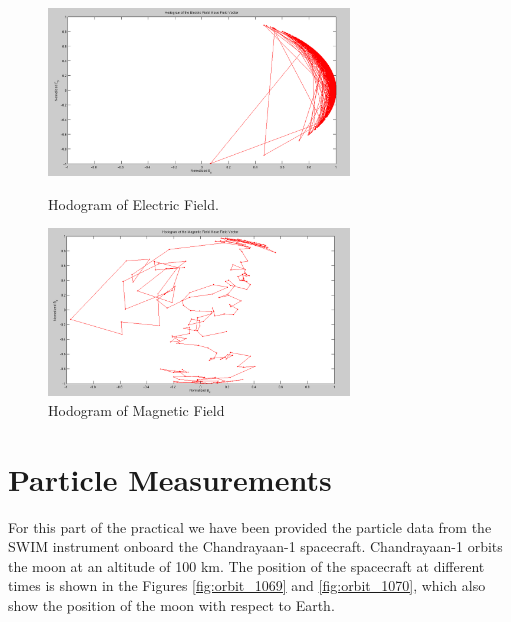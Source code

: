 \documentclass{article}
\begin{document}
\begin{figure}[t!]
\begin{minipage}[c]{0.5\linewidth}
\centering
\includegraphics[width=8cm]{Figures/hodogram_electric.png}
\caption{Hodogram of Electric Field.}
\label{fig:PSD_electric}
\end{minipage}
\hspace{0.1cm}
\begin{minipage}[c]{0.5\linewidth}
\centering
\includegraphics[width=8cm]{Figures/hodogram_magnetic.png}
\caption{Hodogram of Magnetic Field}
\label{fig:PSD_electric_error}
\end{minipage}
\end{figure}

\clearpage
\section{Particle Measurements}

For this part of the practical we have been provided the particle data from the SWIM
instrument onboard the Chandrayaan-1 spacecraft. Chandrayaan-1 orbits the moon at an altitude of 100 km. The position of the spacecraft at different times is shown in the Figures \ref{fig:orbit_1069} and \ref{fig:orbit_1070}, which also show the position of the moon with respect to Earth.
\end{document}
